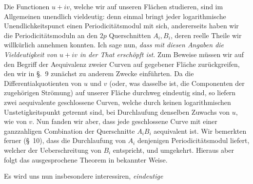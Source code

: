 \documentclass{article}
\begin{document}
Die Functionen $u + iv$, welche wir auf unseren Flächen studieren, sind im Allgemeinen unendlich vieldeutig: denn einmal bringt jeder logarithmische Unendlichkeitspunct einen Periodicitätsmodul mit sich, andererseits haben wir die Periodicitätsmoduln an den $2p$ Querschnitten $A_{i}, B_{i}$, deren reelle Theile wir willkürlich annehmen konnten. Ich sage nun, \emph{dass mit diesen Angaben die Vieldeutigkeit von $u + iv$ in der That erschöpft ist.} Zum Beweise müssen wir auf den Begriff der Aequivalenz zweier Curven auf gegebener Fläche zurückgreifen, den wir in §.~9 zunächst zu anderem Zwecke einführten. Da die Differentialquotienten von $u$ und $v$ (oder, was dasselbe ist, die Componenten der zugehörigen Strömung) auf unserer Fläche durchweg eindeutig sind, so liefern zwei aequivalente geschlossene Curven, welche durch keinen logarithmischen Unstetigkeitspunkt getrennt sind, bei Durchlaufung denselben Zuwachs von $u$, wie von $v$. Nun fanden wir aber, dass jede geschlossene Curve mit einer ganzzahligen Combination der Querschnitte $A_{i}B_{i}$ aequivalent ist. Wir bemerkten ferner (§~10), dass die Durchlaufung von $A_{i}$ denjenigen Periodicitätsmodul liefert, welcher der Ueberschreitung von $B_{i}$ entspricht, und umgekehrt. Hieraus aber folgt das ausgesprochene Theorem in bekannter Weise.

Es wird uns nun insbesondere interessiren, \emph{eindeutige}
\end{document}
